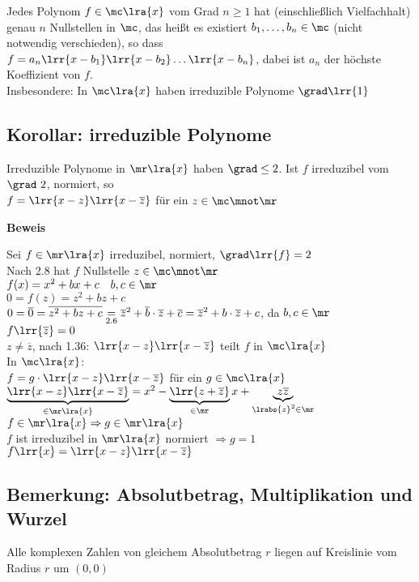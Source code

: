 	Jedes Polynom $f\in\mc\lra{x}$ vom Grad $n\geq 1$ hat (einschließlich Vielfachhalt) genau $n$ Nullstellen in $\mc$, das heißt es existiert $b_1,\dots,b_n\in\mc$ (nicht notwendig verschieden), so dass $f=a_n\lrr{x-b_1}\lrr{x-b_2}\dots\lrr{x-b_n}$, dabei ist $a_n$ der höchste Koeffizient von $f$. \\
	Insbesondere: In $\mc\lra{x}$ haben irreduzible Polynome $\grad\lrr{1}$

\subsection{Korollar: irreduzible Polynome}
	Irreduzible Polynome in $\mr\lra{x}$ haben $\grad\leq 2$. Ist $f$ irreduzibel vom $\grad\ 2$, normiert, so \\
	$f=\lrr{x-z}\lrr{x-\overline{z}}$ für ein $z\in\mc\mnot\mr$

	\textbf{Beweis}

	Sei $f\in\mr\lra{x}$ irreduzibel, normiert, $\grad\lrr{f}=2$\\
	Nach 2.8 hat $f$ Nullstelle $z\in\mc\mnot\mr$\\
	$f(x)=x^2+bx+c\quad b,c\in\mr$\\
	$0=f(z)=z^2+bz+c$\\
	$0=\overline{0}=\overline{z^2+bz+c} \underset{\mbox{\scriptsize 2.6}}{=}\overline{z}^2+\overline{b}\cdot\overline{z}+\overline{c}=\overline{z}^2+b\cdot\overline{z}+c$, da $b,c\in\mr$\\
	$f\lrr{\overline{z}}=0$\\
	$z\neq\overline{z}$, nach 1.36: $\lrr{x-z}\lrr{x-\overline{z}}$ teilt $f$ in $\mc\lra{x}$\\
	In $\mc\lra{x}$:\\
	$f=g\cdot\lrr{x-z}\lrr{x-\overline{z}}$ für ein $g\in\mc\lra{x}$\\
	$\underbrace{\lrr{x-z}\lrr{x-\overline{z}}}_{\in\mr\lra{x}}=x^2-\underbrace{\lrr{z+\overline{z}}}_{\in\mr}x+\underbrace{z\overline{z}}_{\scriptstyle \lrabs{z}^2\in\mr}$\\
	$f\in\mr\lra{x}\Rightarrow g\in\mr\lra{x}$\\
	$f$ ist irreduzibel in $\mr\lra{x}$ normiert $\Rightarrow g=1$\\
	$f\lrr{x}=\lrr{x-z}\lrr{x-\overline{z}}$

\subsection{Bemerkung: Absolutbetrag, Multiplikation und Wurzel}
		\item Alle komplexen Zahlen von gleichem Absolutbetrag $r$ liegen auf Kreislinie vom Radius $r$ um $(0,0)$

